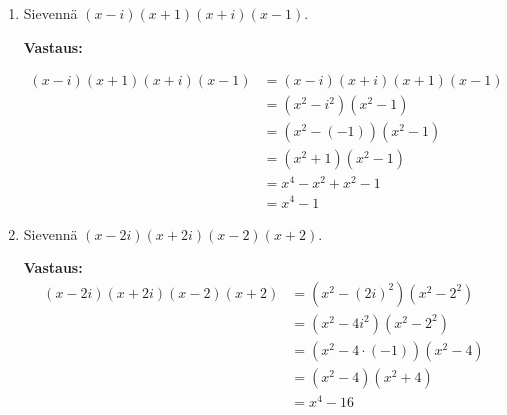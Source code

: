 \documentclass[a4paper,12pt]{article}
\begin{document}
\begin{enumerate}
\begin{enumerate}
\textbf{Vastaus:} Kuten edellisessä tehtävässä todettiin, niiden kompleksilukujen $z$ joukko, jotka toteuttavat ehdon $|z-2|=3$, sisältää kompleksitasolla kaikki sellaisen ympyrän kehäpisteet, jotka muodostuvat ympyrälle, jonka säde on $3$, ja keskipiste kohdassa $(2,0)$. Merkitään tätä ympyrää kirjaimella $A$. Niiden kompleksilukujen $z$ joukko, jotka toteuttavat ehdon $|z-1|=3$, sisältää taas kaikki sellaisen ympyrän kehäpisteet, jotka muodostuvat ympyrälle, jonka säde on $3$, ja keskipiste kompleksitasolla kohdassa $(1,0)$. Merkitään tätä ympyrää kirjaimella $B$. 

Kompleksilukujen $z$ joukko, jotka toteuttavat ehdot $|z-2|=3$ ja $|z-1|=3$, ovat kaikki ympyröiden $A$ ja $B$ kehäpisteet, jotka sisältyvät leikkaukseen $A \cap B$. Koska ehdot $|z-2|=3$ ja $|z-1|=3$ merkitsevät vain ympyröiden kehiä, eivät niiden sisällä olevia alueita, huomaamme, että ympyröiden kehät leikkaavat toisensa vain kahdessa pisteessä, jotka molemmat sijaitsevat keskipisteiden puolivälissä, jossa $x=1,5$. Kompleksilukujen joukko $z$ koostuu siis kahdesta leikkauspisteestä. \vspace{1em}

\item Sievenn\"a $(x-i)(x+1)(x+i)(x-1)$.

\textbf{Vastaus:}

\begin{align*}
    (x-i)(x+1)(x+i)(x-1) &= (x-i)(x+i)(x+1)(x-1)\\
    &=(x^2-i^2)(x^2-1)\\
    &=(x^2-(-1))(x^2-1)\\
    &=(x^2+1)(x^2-1)\\
    &=x^4-x^2+x^2-1\\
    &=x^4-1
\end{align*}


\item Sievenn\"a $(x-2i)(x+2i)(x-2)(x+2)$.

\textbf{Vastaus:} 
\begin{align*}
    (x-2i)(x+2i)(x-2)(x+2)&=(x^2-(2i)^2)(x^2-2^2)\\
    &=(x^2-4i^2)(x^2-2^2)\\
    &=(x^2-4\cdot (-1))(x^2-4)\\
    &=(x^2-4)(x^2+4)\\
    &=x^4-16
\end{align*}
\end{enumerate}

\end{enumerate}
\end{document}
